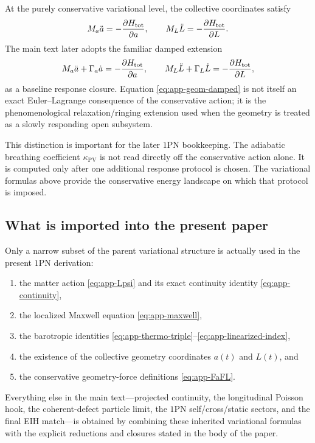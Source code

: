 \documentclass[11pt]{article}
\newcommand{\kPV}{\kappa_{\mathrm{PV}}}
\begin{document}
At the purely conservative variational level, the collective coordinates satisfy
\begin{equation}
M_a \ddot a = -\frac{\partial H_{\rm tot}}{\partial a},
\qquad
M_L \ddot L = -\frac{\partial H_{\rm tot}}{\partial L}.
\label{eq:app-geom-conservative}
\end{equation}
The main text later adopts the familiar damped extension
\begin{equation}
M_a \ddot a + \Gamma_a \dot a = -\frac{\partial H_{\rm tot}}{\partial a},
\qquad
M_L \ddot L + \Gamma_L \dot L = -\frac{\partial H_{\rm tot}}{\partial L},
\label{eq:app-geom-damped}
\end{equation}
as a baseline response closure. Equation \eqref{eq:app-geom-damped} is not itself an
exact Euler--Lagrange consequence of the conservative action; it is the phenomenological
relaxation/ringing extension used when the geometry is treated as a slowly responding open
subsystem.

This distinction is important for the later \(1\)PN bookkeeping. The adiabatic breathing
coefficient \(\kPV\) is not read directly off the conservative action alone. It is
computed only after one additional response protocol is chosen. The variational formulas
above provide the conservative energy landscape on which that protocol is imposed.

\subsection{What is imported into the present paper}
\label{app:variational-imported}

Only a narrow subset of the parent variational structure is actually used in the present
\(1\)PN derivation:
\begin{enumerate}[leftmargin=1.5em]
  \item the matter action \eqref{eq:app-Lpsi} and its exact continuity identity
  \eqref{eq:app-continuity},
  \item the localized Maxwell equation \eqref{eq:app-maxwell},
  \item the barotropic identities \eqref{eq:app-thermo-triple}--\eqref{eq:app-linearized-index},
  \item the existence of the collective geometry coordinates \(a(t)\) and \(L(t)\), and
  \item the conservative geometry-force definitions \eqref{eq:app-FaFL}.
\end{enumerate}
Everything else in the main text---projected continuity, the longitudinal Poisson hook,
the coherent-defect particle limit, the \(1\)PN self/cross/static sectors, and the final
EIH match---is obtained by combining these inherited variational formulas with the
explicit reductions and closures stated in the body of the paper.
\end{document}
